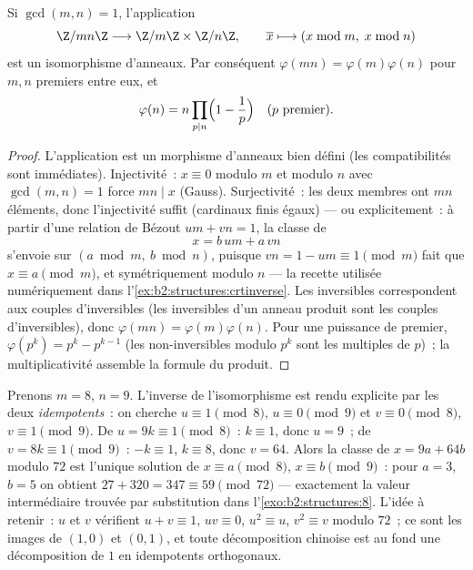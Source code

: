 \begin{theorem}\label{thm:b2:structures:crt}
Si $\gcd(m, n) = 1$, l'application
\[
\Z/mn\Z \longrightarrow \Z/m\Z \times \Z/n\Z,
\qquad
\overline{x} \longmapsto (x \bmod m,\; x \bmod n)
\]
est un isomorphisme d'anneaux. Par
conséquent $\varphi(mn) = \varphi(m)\varphi(n)$ pour $m, n$ premiers
entre eux, et
\[
\varphi(n) = n \prod_{p \mid n} \Bigl(1 - \frac 1p\Bigr)
\quad (p \text{ premier}).
\]
\end{theorem}

\begin{proof}
L'application est un morphisme d'anneaux bien défini (les
compatibilités sont immédiates). Injectivité~: $x \equiv 0$ modulo $m$
et modulo $n$ avec $\gcd(m,n) = 1$ force $mn \mid x$ (Gauss).
Surjectivité~: les deux membres ont $mn$ éléments, donc l'injectivité
suffit (cardinaux finis égaux) --- ou explicitement~: à partir d'une
relation de Bézout $um + vn = 1$, la classe de
\[
x = b\,um + a\,vn
\]
s'envoie sur $(a \bmod m,\ b \bmod n)$, puisque $vn = 1 - um \equiv 1
\pmod m$ fait que $x \equiv a \pmod m$, et symétriquement modulo $n$
--- la recette utilisée numériquement dans
l'\cref{ex:b2:structures:crtinverse}. Les inversibles correspondent
aux couples d'inversibles (les inversibles d'un anneau produit sont
les couples d'inversibles), donc $\varphi(mn) =
\varphi(m)\varphi(n)$. Pour une puissance de premier, $\varphi(p^k) =
p^k - p^{k-1}$ (les non-inversibles modulo $p^k$ sont les multiples de
$p$)~; la multiplicativité assemble la formule du produit.
\end{proof}

\begin{example}\label{ex:b2:structures:crtinverse}
Prenons $m = 8$, $n = 9$. L'inverse de l'isomorphisme est rendu
explicite par les deux \emph{idempotents}~: on cherche $u \equiv 1
\pmod 8$, $u \equiv 0 \pmod 9$ et $v \equiv 0 \pmod 8$, $v \equiv 1
\pmod 9$. De $u = 9k \equiv 1 \pmod 8$~: $k \equiv 1$, donc $u = 9$~;
de $v = 8k \equiv 1 \pmod 9$~: $-k \equiv 1$, $k \equiv 8$, donc $v =
64$. Alors la classe de $x = 9a + 64b$ modulo $72$ est l'unique
solution de $x \equiv a \pmod 8$, $x \equiv b \pmod 9$~: pour $a =
3$, $b = 5$ on obtient $27 + 320 = 347 \equiv 59 \pmod{72}$ ---
exactement la valeur intermédiaire trouvée par substitution dans
l'\cref{exo:b2:structures:8}. L'idée à retenir~: $u$ et $v$
vérifient $u + v \equiv 1$, $uv \equiv 0$, $u^2 \equiv u$, $v^2
\equiv v$ modulo $72$~; ce sont les images de $(1, 0)$ et $(0,
1)$, et toute décomposition chinoise est au fond une décomposition
de $1$ en idempotents orthogonaux.
\end{example}

